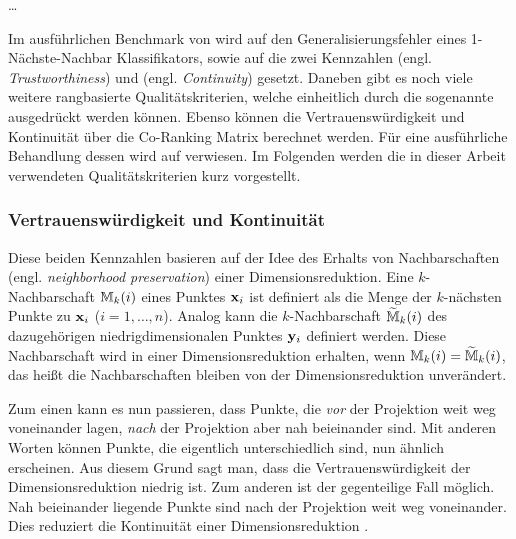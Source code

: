 \ldots
{}

Im ausführlichen Benchmark von \textcite{vanderMaaten.2009} wird auf den Generalisierungsfehler
eines 1-Nächste-Nachbar Klassifikators, sowie auf die zwei Kennzahlen
 (engl. \textit{Trustworthiness}) und  (engl.
\textit{Continuity}) \parencites{Venna.2001}{Venna.2006} gesetzt. Daneben gibt es noch viele weitere rangbasierte
Qualitätskriterien, welche einheitlich durch die sogenannte  ausgedrückt
werden können. Ebenso können die Vertrauenswürdigkeit und Kontinuität über die Co-Ranking Matrix
berechnet werden. Für eine ausführliche Behandlung dessen wird auf \textcite{Lee.2009} verwiesen.
Im Folgenden werden die in dieser Arbeit verwendeten Qualitätskriterien kurz vorgestellt.

\subsubsection{Vertrauenswürdigkeit und Kontinuität}
Diese beiden Kennzahlen basieren auf der Idee des Erhalts von Nachbarschaften (engl.
\textit{neighborhood preservation}) einer Dimensionsreduktion. Eine $k$-Nachbarschaft
$\mathbb{M}_k(i)$ eines Punktes $\mathbf{x}_i$ ist definiert als die Menge der $k$-nächsten Punkte zu
$\mathbf{x}_i$ ($i = 1, \ldots, n$). Analog kann die $k$-Nachbarschaft $\widetilde{\mathbb{M}}_k(i)$ des
dazugehörigen niedrigdimensionalen Punktes $\mathbf{y}_i$ definiert werden. Diese Nachbarschaft wird
in einer Dimensionsreduktion erhalten, wenn $\mathbb{M}_k(i) = \widetilde{\mathbb{M}}_k(i)$, das heißt
die Nachbarschaften bleiben von der Dimensionsreduktion unverändert.

Zum einen kann es nun passieren, dass Punkte, die \textit{vor} der Projektion weit weg voneinander
lagen, \textit{nach} der Projektion aber nah beieinander sind. Mit anderen Worten können Punkte,
die eigentlich unterschiedlich sind, nun ähnlich erscheinen. Aus diesem Grund sagt man, dass die
Vertrauenswürdigkeit der Dimensionsreduktion niedrig ist. Zum anderen ist der gegenteilige Fall
möglich. Nah beieinander liegende Punkte sind nach der Projektion weit weg voneinander. Dies
reduziert die Kontinuität einer Dimensionsreduktion \parencite[486 -- 487]{Venna.2001}.

